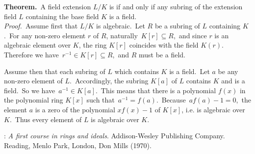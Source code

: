 \documentclass[12pt]{article}
\theoremstyle{definition}
\begin{document}
\textbf{Theorem.}\, A field extension $L/K$ is  if and only if any subring of the extension field $L$ containing the base field $K$ is a field.\\

{\em Proof.}\, Assume first that $L/K$ is algebraic.\, Let $R$ be a subring of $L$ containing $K$.\, For any non-zero element $r$ of $R$, naturally\, $K[r] \subseteq R$,\, and since $r$ is an algebraic element over $K$, the ring $K[r]$ coincides with the field $K(r)$.\, Therefore we have\, $r^{-1} \in K[r] \subseteq R$,\, and $R$ must be a field.

Assume then that each subring of $L$ which contains $K$ is a field.\, Let $a$ be any non-zero element of $L$.\, Accordingly, the subring $K[a]$ of $L$ contains $K$ and is a field.\, So we have\, $a^{-1} \in K[a]$.\, This means that there is a polynomial $f(x)$ in the polynomial ring $K[x]$ such that\, $a^{-1} = f(a)$.\, Because\, $af(a)-1 = 0$,\, the element $a$ is a zero of the polynomial $xf(x)-1$ of $K[x]$, i.e. is algebraic over $K$.\, Thus every element of $L$ is algebraic over $K$.

\begin{thebibliography}{9}
: {\em A first course in rings and ideals}. Addison-Wesley Publishing Company. Reading, Menlo Park, London, Don Mills (1970).
\end{thebibliography}

\end{document}
